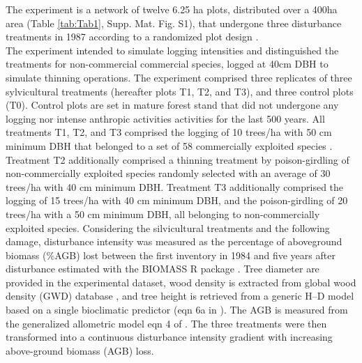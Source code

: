 \documentclass[fleqn,10pt]{ArtEcoFoG} %
\begin{document}
The experiment is a network of twelve 6.25 ha plots\color{red},
distributed over a 400ha area \color{black}(Table \ref{tab:Tab1}, Supp.
Mat. Fig. S1), that undergone three disturbance treatments in 1987
according to a randomized plot design \citep{Gourlet-Fleury2004}.\\
\color{red}The experiment intended to simulate logging intensities and
distinguished the treatments for non-commercial commercial species,
logged at 40cm DBH to simulate thinning operations.\color{black} The
experiment comprised three replicates of three sylvicultural treatments
(hereafter plots T1, T2, and T3), and three control plots (T0).
\color{red}Control plots are set in mature forest stand that did not
undergone any logging nor intense anthropic activities activities for
the last 500 years\color{black}. All treatments T1, T2, and T3 comprised
the logging of 10 trees/ha with 50 cm minimum DBH that belonged to a set
of 58 commercially exploited species \citep{Gourlet-Fleury2004}.
Treatment T2 additionally comprised a thinning treatment by
poison-girdling of non-commercially exploited species randomly selected
with an average of 30 trees/ha with 40 cm minimum DBH. Treatment T3
additionally comprised the logging of 15 trees/ha with 40 cm minimum
DBH, and the poison-girdling of 20 trees/ha with a 50 cm minimum DBH,
all belonging to non-commercially exploited species. Considering the
silvicultural treatments and the following damage, disturbance intensity
was measured as the percentage of aboveground biomass (\%AGB) lost
between the first inventory in 1984 and five years after disturbance
\citep{Piponiot2016} estimated with the BIOMASS R package
\citep{Rejou2017}. \color{red} Tree diameter are provided in the
experimental dataset, wood density is extracted from global wood density
(GWD) database \citep{Zanne2009}, and tree height is retrieved from a
generic H--D model based on a single bioclimatic predictor (eqn 6a in
\citep{Chave2014}). The AGB is measured from the generalized allometric
model eqn 4 of \citep{Chave2014}. \color{black} The three treatments
were then transformed into a continuous disturbance intensity gradient
with increasing above-ground biomass (AGB) loss.
\end{document}
